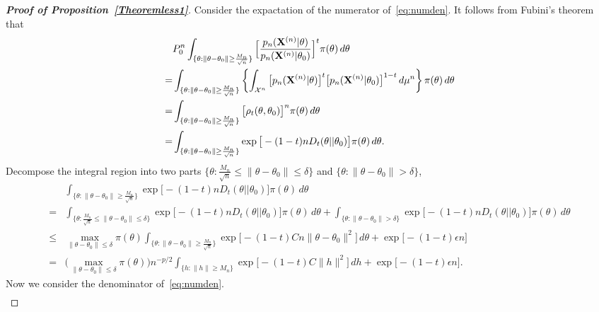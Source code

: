 \documentclass[11pt]{article}
\theoremstyle{plain}
\theoremstyle{definition}
\theoremstyle{remark}
\begin{document}
\begin{appendices}
\begin{proof}[\textbf{Proof of Proposition~\ref{Theoremless1}}]
    Consider the expactation of the numerator of~\ref{eq:numden}.
    It follows from Fubini's theorem that
    $$
    \begin{aligned}
        &P_0^n\int_{\{\theta:\|\theta-\theta_0\|\geq \frac{M_n}{\sqrt{n}}\} } \Big[ \frac{p_n(\BX^{(n)}|\theta)}{p_n(\BX^{(n)}|\theta_0)}  \Big]^{t} \pi(\theta) \, d \theta
        \\
        =&
        \int_{\{\theta:\|\theta-\theta_0\|\geq \frac{M_n}{\sqrt{n}}\} } \left\{\int_{\mathcal{X}^n}\big[ {p_n} (\BX^{(n)}|\theta)\big]^t \big[ p_n (\BX^{(n)}|\theta_0) \big]^{1-t} \, d\mu^n \right\} \pi(\theta) \, d \theta\\
        =&
        \int_{\{\theta:\|\theta-\theta_0\|\geq \frac{M_n}{\sqrt{n}}\} } \big[ \rho_{t}(\theta,\theta_0) \big]^n \pi(\theta) \, d \theta\\
        = &
        \int_{\{\theta:\|\theta-\theta_0\|\geq \frac{M_n}{\sqrt{n}}\} } \exp \big[-(1-t) n D_t(\theta||\theta_0) \big] \pi(\theta) \, d \theta.
    \end{aligned}
    $$
    Decompose the integral region into two parts $\{\theta:\frac{M_n}{\sqrt{n}}\leq \|\theta-\theta_0\|\leq \delta \}$ and $\{\theta: \|\theta-\theta_0\|>\delta\}$, 
    $$
    \begin{aligned}
        &\int_{\{\theta:\|\theta-\theta_0\|\geq \frac{M_n}{\sqrt{n}}\} } 
        \exp \big[ -(1-t) {n} D_t(\theta||\theta_0) \big] \pi(\theta) \, d \theta
        \\
        =&\int_{\{\theta:\frac{M_n}{\sqrt{n}}\leq \|\theta-\theta_0\|\leq \delta \}}
        \exp\big[ -(1-t) {n} D_t(\theta||\theta_0) \big] \pi(\theta) \, d \theta+
        \int_{\{\theta: \|\theta-\theta_0\|>\delta\}} \exp\big[ -(1-t) {n} D_t(\theta||\theta_0) \big] \pi(\theta) \, d \theta
        \\
        \leq &
        \max_{\|\theta-\theta_0\|\leq \delta}\pi(\theta)
        \int_{\big\{\theta: \|\theta-\theta_0\|\geq \frac{M_n}{\sqrt{n}} \big\}}
        \exp\big[ -(1-t)C {n} \|\theta-\theta_0\|^2 \big]
        \, d \theta
        +
        \exp\big[ -(1-t)\epsilon n\big]
        \\
        =&
        \big(\max_{\|\theta-\theta_0\|\leq \delta}\pi(\theta)\big)
        n^{-p/2}\int_{\big\{h: \|h\|\geq M_n \big\}} \exp\big[-(1-t)C \|h\|^2 \big] \, d h
        +
        \exp\big[ -(1-t)\epsilon n\big].
    \end{aligned}
    $$
    Now we consider the denominator of~\eqref{eq:numden}.
    $$
    \begin{aligned}

\end{aligned}$$
\end{proof}
\end{appendices}
\end{document}
